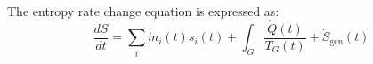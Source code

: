 The entropy rate change equation is expressed as:  
\[
\frac{dS}{dt} = \sum_i \dot{m}_i(t) s_i(t) + \int_{G} \frac{\dot{Q}(t)}{T_G(t)} + \dot{S}_{\text{gen}}(t)
\]